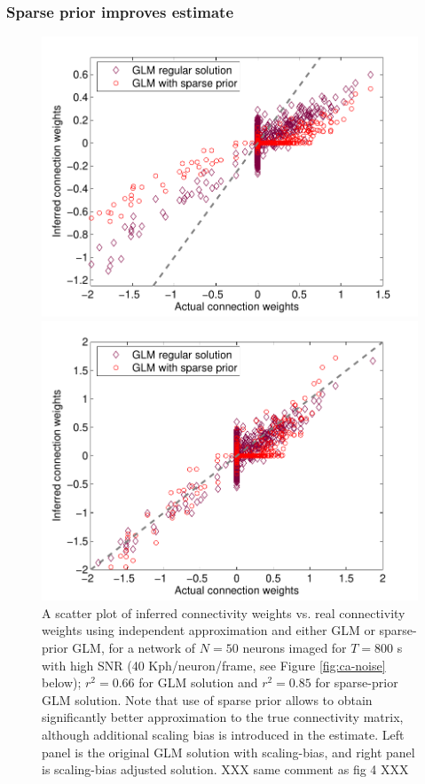 \clearpage
\subsubsection{Sparse prior improves estimate}

\begin{figure}[h]
\centering
\begin{minipage}[c]{0.45\hsize}
\includegraphics[width=\hsize]{../figs/Figure9_fluor_sparse_sol}
\end{minipage}
\begin{minipage}[c]{0.45\hsize}
\includegraphics[width=\hsize]{../figs/Figure9b_fluor_sparse_sol}
\end{minipage}
\caption{A scatter plot of inferred connectivity weights vs. real connectivity weights
using independent approximation and either GLM or sparse-prior GLM,
for a network of $N=50$ neurons imaged for $T=800$ s
with high SNR (40 Kph/neuron/frame, see Figure \ref{fig:ca-noise} below); $r^2=0.66$ for GLM solution and $r^2=0.85$ for sparse-prior GLM solution. Note that use of sparse prior allows to obtain significantly better approximation to the true connectivity matrix, although additional scaling bias is introduced in the estimate.
Left panel is the original GLM solution with scaling-bias, and right panel is scaling-bias adjusted solution. XXX same comment as fig 4 XXX}
\label{fig:sparse-sol}
\end{figure}


